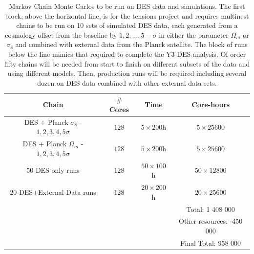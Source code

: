 \documentclass[12pt]{article}
\begin{document}
\begin{small}
\begin{table}[h!]
\begin{center}
\begin{tabular}{c|cc|c}
 Chain         & $\#$ Cores &  Time & Core-hours   \\ 
\hline
DES + Planck  $\sigma_8$ - $1,2,3,4,5\sigma$ & $128$ & $5\times200$h & $5\times25600$  \\ 
DES + Planck $\Omega_m$ - $1,2,3,4,5\sigma$ & $128$ & $5\times200$h & $5\times25600$  \\  
\hline
 50-DES only runs & $128$ & $50\times100$h & $50\times12800$  \\  
 20-DES+External Data runs & $128$ & $20\times200$h & $20\times25600$  \\  
\hline
& &  & Total: 1 408 000\\
& &  & Other resources: -450 000\\
& &  & Final Total: 958 000\\
\end{tabular}


\caption{Markov Chain Monte Carlos to be run on DES data and simulations. The first block, above the horizontal line, is for the tensions project and requires multinest chains to be run on 10 sets of simulated DES data, each generated from a cosmology offset from the baseline by $1,2,\ldots,5-\sigma$ in either the parameter $\Omega_m$ or $\sigma_8$ and combined with external data from the Planck satellite. %
The block of runs below the line mimics that required to complete the Y3 DES analysis. Of order fifty chains will be needed from start to finish on different subsets of the data and using different models. Then, production runs will be required including several dozen on DES data combined with other external data sets.}
\label{tab:post}
\end{center}
\end{table}



\end{small}
\end{document}
